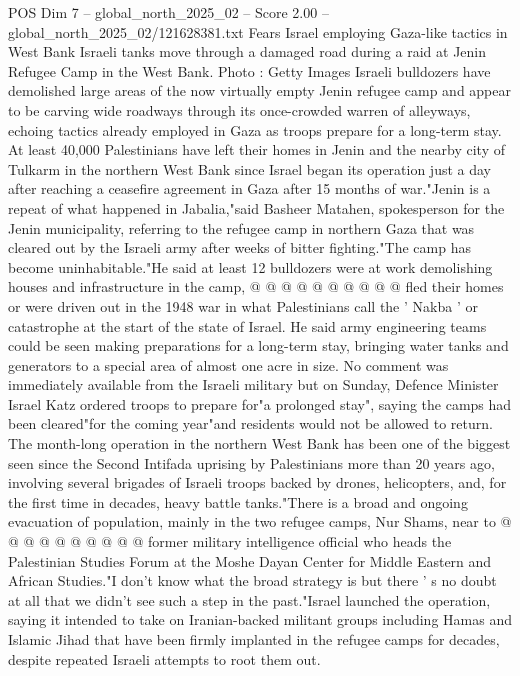 \begin{textsample}{POS Dim 7 – global\_north\_2025\_02 – Score 2.00 – global\_north\_2025\_02/121628381.txt}  \label{ex:f7_pos_382}
Fears Israel employing Gaza-like tactics in West Bank Israeli tanks move through a damaged road during a raid at Jenin Refugee Camp in the West Bank.
Photo : Getty Images Israeli bulldozers have demolished large areas of the now virtually empty Jenin refugee camp and appear to be carving wide roadways through its once-crowded warren of alleyways, echoing tactics already employed in Gaza as troops prepare for a long-term stay.
At least 40,000 Palestinians have left their homes in Jenin and the nearby city of Tulkarm in the northern West Bank since Israel began its operation just a day after reaching a ceasefire agreement in Gaza after 15 months of war."Jenin is a repeat of what happened in Jabalia,"said Basheer Matahen, spokesperson for the Jenin municipality, referring to the refugee camp in northern Gaza that was cleared out by the Israeli army after weeks of bitter fighting."The camp has become uninhabitable."He said at least 12 bulldozers were at work demolishing houses and infrastructure in the camp, @ @ @ @ @ @ @ @ @ @ fled their homes or were driven out in the 1948 war in what Palestinians call the ' Nakba ' or catastrophe at the start of the state of Israel.
He said army engineering teams could be seen making preparations for a long-term stay, bringing water tanks and generators to a special area of almost one acre in size.
No comment was immediately available from the Israeli military but on Sunday, Defence Minister Israel Katz ordered troops to prepare for"a prolonged stay", saying the camps had been cleared"for the coming year"and residents would not be allowed to return.
The month-long operation in the northern West Bank has been one of the biggest seen since the Second Intifada uprising by Palestinians more than 20 years ago, involving several brigades of Israeli troops backed by drones, helicopters, and, for the first time in decades, heavy battle tanks."There is a broad and ongoing evacuation of population, mainly in the two refugee camps, Nur Shams, near to @ @ @ @ @ @ @ @ @ @ former military intelligence official who heads the Palestinian Studies Forum at the Moshe Dayan Center for Middle Eastern and African Studies."I don't know what the broad strategy is but there ' s no doubt at all that we didn't see such a step in the past."Israel launched the operation, saying it intended to take on Iranian-backed militant groups including Hamas and Islamic Jihad that have been firmly implanted in the refugee camps for decades, despite repeated Israeli attempts to root them out.

\end{textsample}
